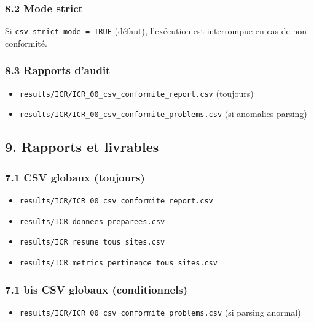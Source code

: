 \subsubsection{8.2 Mode strict}\label{mode-strict}

Si \texttt{csv\_strict\_mode\ =\ TRUE} (défaut), l'exécution est
interrompue en cas de non-conformité.

\subsubsection{8.3 Rapports d'audit}\label{rapports-daudit}

\begin{itemize}
\tightlist
\item
  \texttt{results/ICR/ICR\_00\_csv\_conformite\_report.csv} (toujours)
\item
  \texttt{results/ICR/ICR\_00\_csv\_conformite\_problems.csv} (si
  anomalies parsing)
\end{itemize}

\subsection{9. Rapports et livrables}\label{rapports-et-livrables}

\subsubsection{7.1 CSV globaux (toujours)}\label{csv-globaux-toujours}

\begin{itemize}
\tightlist
\item
  \texttt{results/ICR/ICR\_00\_csv\_conformite\_report.csv}
\item
  \texttt{results/ICR\_donnees\_preparees.csv}
\item
  \texttt{results/ICR\_resume\_tous\_sites.csv}
\item
  \texttt{results/ICR\_metrics\_pertinence\_tous\_sites.csv}
\end{itemize}

\subsubsection{7.1 bis CSV globaux
(conditionnels)}\label{bis-csv-globaux-conditionnels}

\begin{itemize}
\tightlist
\item
  \texttt{results/ICR/ICR\_00\_csv\_conformite\_problems.csv} (si
  parsing anormal)
\end{itemize}

